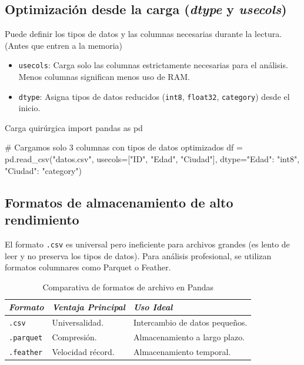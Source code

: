 \subsection{Optimización desde la carga (\textit{dtype} y \textit{usecols})}

Puede definir los tipos de datos y las columnas necesarias durante la lectura. (Antes que entren a la memoria)

\begin{itemize}
\item \texttt{usecols}: Carga solo las columnas estrictamente necesarias para el análisis. Menos columnas significan menos uso de RAM.
\item \texttt{dtype}: Asigna tipos de datos reducidos (\texttt{int8}, \texttt{float32}, \texttt{category}) desde el inicio.
\end{itemize}

\begin{pycode}{Carga quirúrgica}
import pandas as pd

# Cargamos solo 3 columnas con tipos de datos optimizados
df = pd.read_csv("datos.csv",
    usecols=["ID", "Edad", "Ciudad"],
    dtype={"Edad": "int8", "Ciudad": "category"})
\end{pycode}

\subsection{Formatos de almacenamiento de alto rendimiento}

El formato \texttt{.csv} es universal pero ineficiente para archivos grandes (es lento de leer y no preserva los tipos de datos). Para análisis profesional, se utilizan formatos columnares como Parquet o Feather.

\begin{table}[h]
\centering
\begin{tabular}{|l|l|l|}
\hline
\textit{Formato} & \textit{Ventaja Principal} & \textit{Uso Ideal} \\ \hline
\texttt{.csv} & Universalidad. & Intercambio de datos pequeños. \\ \hline
\texttt{.parquet} & Compresión. & Almacenamiento a largo plazo. \\ \hline
\texttt{.feather} & Velocidad récord. & Almacenamiento temporal. \\ \hline
\end{tabular}
\caption{Comparativa de formatos de archivo en Pandas}
\end{table}

